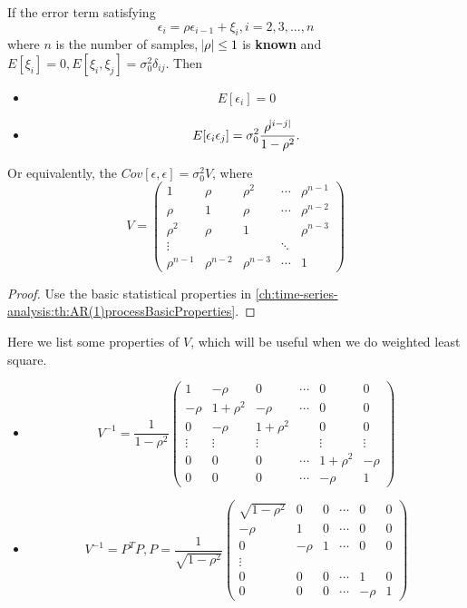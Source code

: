 \begin{refsection}
\begin{lemma}
If the error term satisfying 
$$\epsilon_i = \rho \epsilon_{i-1} + \xi_i, i = 2,3,...,n$$
where $n$ is the number of samples, $\abs{\rho}\leq 1$ is \textbf{known} and $E[\xi_i] = 0, E[\xi_i,\xi_j] = \sigma_0^2\delta_{ij}$. Then
\begin{itemize}
	\item $$E[\epsilon_i] = 0$$
	\item $$E[\epsilon_i\epsilon_j] = \sigma_0^2 \frac{\rho^{\abs{i-j}}}{1- \rho^2}.$$
\end{itemize}
Or equivalently, the $Cov[\epsilon,\epsilon] = \sigma_0^2 V$, where
$$V = \begin{pmatrix}
1 & \rho & \rho^2 & \cdots & \rho^{n-1}\\ 
\rho & 1 & \rho & \cdots & \rho^{n-2} \\ 
\rho^2 & \rho & 1 &  & \rho^{n-3}\\ 
\vdots &  &  & \ddots & \\ 
\rho^{n-1} & \rho^{n-2} & \rho^{n-3} & \cdots & 1 
\end{pmatrix}$$
	
\end{lemma}
\begin{proof}
Use the basic statistical properties in \autoref{ch:time-series-analysis:th:AR(1)processBasicProperties}.
\end{proof}



\begin{remark}\hfill
Here we list some properties of $V$, which will be useful when we do weighted least square.	
\begin{itemize}
	\item $$V^{-1} = \frac{1}{1-\rho^2}\begin{pmatrix}
	1 & -\rho & 0 & \cdots & 0 & 0\\ 
	-\rho & 1+\rho^2 & -\rho & \cdots & 0 & 0\\ 
	0 & -\rho & 1+\rho^2 &  & 0 & 0\\ 
	\vdots & \vdots & \vdots &  & \vdots & \vdots\\ 
	0 & 0 & 0 & \cdots & 1+\rho^2 & -\rho\\ 
	0 & 0 & 0 & \cdots & -\rho & 1
	\end{pmatrix}$$
	\item $$V^{-1} = P^TP, P =\frac{1}{\sqrt{1-\rho^2}} \begin{pmatrix}
	\sqrt{1-\rho^2} & 0 & 0 & \cdots & 0 & 0\\ 
	-\rho & 1 & 0 & \cdots & 0 & 0\\ 
	0 & -\rho & 1 & \cdots & 0 & 0\\ 
	\vdots &  &  &  &  & \\ 
	0 & 0 & 0 & \cdots & 1 & 0 \\ 
	0 & 0 & 0 & \cdots & -\rho & 1
	\end{pmatrix}$$
	

\end{itemize}
\end{remark}
\end{refsection}

